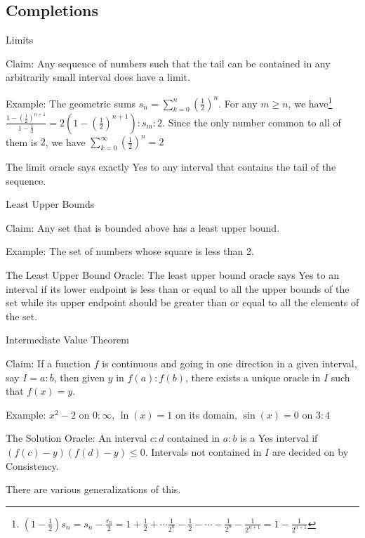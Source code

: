 \documentclass{beamer}
\begin{document}
\subsection{Completions}

\begin{frame}{Limits}

Claim: Any sequence of numbers such that the tail can be contained in any arbitrarily small interval does have a limit. 

Example: The geometric sums $s_n = \sum_{k=0}^n (\frac{1}{2})^n$. For any $m \geq n$, we have\footnote{$(1-\frac{1}{2} ) s_n = s_n - \frac{s_n}{2} = 1 + \frac{1}{2} + \cdots \frac{1}{2^n} - \frac{1}{2} - \cdots -\frac{1}{2^n} - \frac{1}{2^{n+1} } = 1 - \frac{1}{2^{n+1}}$ } $\frac{1 - (\frac{1}{2})^{n+1}}{1 - \frac{1}{2}}= 2 (1 - (\frac{1}{2})^{n+1}):s_m:2$. Since the only number common to all of them is $2$, we have $\sum_{k=0}^{\infty} (\frac{1}{2})^n = 2$

The limit oracle says exactly Yes to any interval that contains the tail of the sequence. 


    
\end{frame}

\begin{frame}{Least Upper Bounds}

Claim:  Any set that is bounded above has a least upper bound. 

Example:  The set of numbers whose square is less than 2. 

The Least Upper Bound Oracle:  The least upper bound oracle says Yes to an interval if its lower endpoint is less than or equal to all the upper bounds of the set while its upper endpoint should be greater than or equal to all the elements of the set. 
    
\end{frame}

\begin{frame}{Intermediate Value Theorem}

Claim: If a function $f$ is continuous and going in one direction in a given interval, say $I = a:b$, then given $y$ in $f(a):f(b)$, there exists a unique oracle in $I$ such that $f(x) = y$. 

Example: $x^2 -2$ on $0:\infty$,  $\ln(x) = 1$ on its domain, $\sin(x) = 0$ on $3:4$

The Solution Oracle:  An interval $c:d$ contained in $a:b$ is a Yes interval if $( f(c) - y)(f(d) - y) \leq 0$. Intervals not contained in $I$ are decided on by Consistency. 

There are various generalizations of this. 
    
\end{frame}
\end{document}
